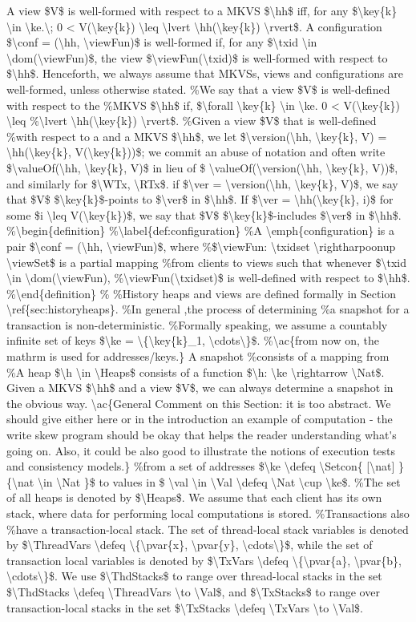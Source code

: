 \ac{
A view $V$ is well-formed with respect to a MKVS $\hh$ iff, 
for any $\key{k} \in \ke.\; 0 < V(\key{k}) \leq \lvert \hh(\key{k}) \rvert$. 
A configuration $\conf = (\hh, \viewFun)$ is well-formed if, for any 
$\txid \in \dom(\viewFun)$, the view $\viewFun(\txid)$ is well-formed with respect 
to $\hh$. Henceforth, we always assume that MKVSs, views and configurations are well-formed, 
unless otherwise stated.
and a MKVS $\hh$, we let $\version(\hh, \key{k}, V) = 
\hh(\key{k}, V(\key{k}))$; we commit an abuse of notation and 
often write $\valueOf(\hh, \key{k}, V)$ in lieu of $
\valueOf(\version(\hh, \key{k}, V))$, and similarly for $\WTx, \RTx$.
if $\ver = \version(\hh, \key{k}, V)$,  
we say that $V$ $\key{k}$-points to $\ver$ in $\hh$. If $\ver = \hh(\key{k}, i)$ 
for some $i \leq V(\key{k})$, we say that $V$ $\key{k}$-includes $\ver$ in $\hh$.


%


A snapshot 
$\h \in \Heaps$ consists of a function 
$\h: \ke \rightarrow \Nat$. 
Given a MKVS $\hh$ and a view $V$, we can always determine a snapshot in 
the obvious way. 




\ac{General Comment on this Section: it is too abstract. We 
should give either here or in the introduction an example of computation - 
the write skew program should be okay that helps the reader understanding 
what's going on. Also, it could be also good to illustrate the notions 
of execution tests and consistency models.}
We assume that each client has its own stack, 
where data for performing local computations is stored. 
The set of thread-local stack variables is denoted by $\ThreadVars \defeq \{\pvar{x}, \pvar{y}, \cdots\}$, 
while the set of transaction local variables is denoted by $\TxVars \defeq \{\pvar{a}, \pvar{b}, \cdots\}$. 
We use $\ThdStacks$ to range over thread-local stacks in the set $\ThdStacks \defeq \ThreadVars \to \Val$, 
and $\TxStacks$ to range over transaction-local stacks in the set $\TxStacks \defeq \TxVars \to \Val$.
}
